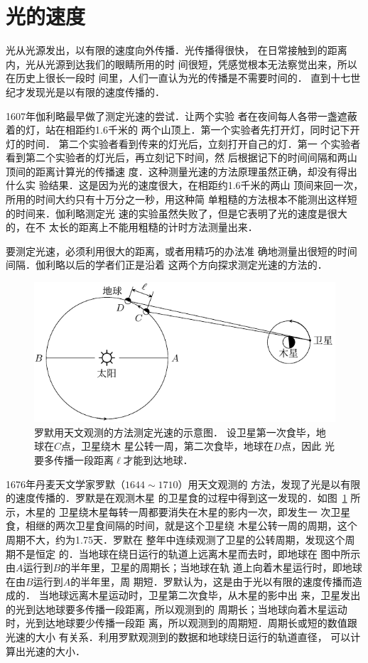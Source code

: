 \section{光的速度}
光从光源发出，以有限的速度向外传播．光传播得很快，
在日常接触到的距离内，光从光源到达我们的眼睛所用的时
间很短，凭感觉根本无法察觉出来，所以在历史上很长一段时
间里，人们一直认为光的传播是不需要时间的．
直到十七世
纪才发现光是以有限的速度传播的．

1607年伽利略最早做了测定光速的尝试．让两个实验
者在夜间每人各带一盏遮蔽着的灯，站在相距约1.6千米的
两个山顶上．第一个实验者先打开灯，同时记下开灯的时间．
第二个实验者看到传来的灯光后，立刻打开自己的灯．第一
个实验者看到第二个实验者的灯光后，再立刻记下时间，然
后根据记下的时间间隔和两山顶间的距离计算光的传播速
度．这种测量光速的方法原理虽然正确，却没有得出什么实
验结果．这是因为光的速度很大，在相距约1.6千米的两山
顶间来回一次，所用的时间大约只有十万分之一秒，用这种简
单粗糙的方法根本不能测出这样短的时间来．伽利略测定光
速的实验虽然失败了，但是它表明了光的速度是很大的，在不
太长的距离上不能用粗糙的计时方法测量出来．


要测定光速，必须利用很大的距离，或者用精巧的办法准
确地测量出很短的时间间隔．伽利略以后的学者们正是沿着
这两个方向探求测定光速的方法的．

\begin{figure}[htbp]
    \centering
    \includegraphics{fig/C/5-4.pdf}
    \caption{罗默用天文观测的方法测定光速的示意图．
    设卫星第一次食毕，地球在$C$点，卫星绕木
    星公转一周，第二次食毕，地球在$D$点，因此
    光要多传播一段距离$\ell$才能到达地球．}\label{fig_C_5-4}
\end{figure}

1676年丹麦天文学家罗默（$1644 \sim 1710$）用天文观测的
方法，发现了光是以有限的速度传播的．罗默是在观测木星
的卫星食的过程中得到这一发现的．如图~\ref{fig_C_5-4} 所示，木星的
卫星绕木星每转一周都要消失在木星的影内一次，即发生一
次卫星食，相继的两次卫星食间隔的时间，就是这个卫星绕
木星公转一周的周期，这个周期不大，约为1.75天．罗默在
整年中连续观测了卫星的公转周期，发现这个周期不是恒定
的．当地球在绕日运行的轨道上远离木星而去时，即地球在
图中所示由$A$运行到$B$的半年里，卫星的周期长；当地球在轨
道上向着木星运行时，即地球在由$B$运行到$A$的半年里，周
期短．罗默认为，这是由于光以有限的速度传播而造成的．
当地球远离木星运动时，卫星第二次食毕，从木星的影中出
来，卫星发出的光到达地球要多传播一段距离，所以观测到的
周期长；当地球向着木星运动时，光到达地球要少传播一段距
离，所以观测到的周期短．周期长或短的数值跟光速的大小
有关系．利用罗默观测到的数据和地球绕日运行的轨道直径，
可以计算出光速的大小．

